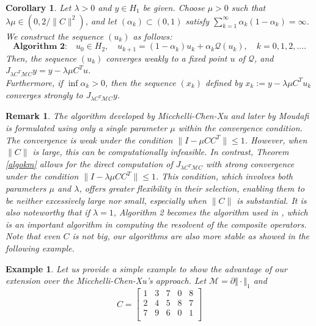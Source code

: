 \documentclass[11pt]{article}
\theoremstyle{plain}
\newtheorem{remark}{Remark}
\newtheorem{example}{Example}
\newtheorem{corollary}[theorem]{Corollary}
\begin{document}
{\begin{corollary}\label{alkm}
Let $\lambda > 0$ and $y \in H_1$ be given. Choose $\mu>0$ such that ${\lambda}{\mu} \in (0, 2/\|C\|^2)$, and let $(\alpha_k) \subset (0,1)$ satisfy $\sum_{k=1}^\infty \alpha_k (1 - \alpha_k) = \infty$. We construct the sequence $(u_k)$ as follows:
\begin{equation*}
\textbf{Algorithm 2:} \quad u_0 \in H_2, \quad u_{k+1} = (1 - \alpha_k)u_k + \alpha_k \mathcal{Q}(u_k), \quad k = 0, 1, 2, \ldots.
\end{equation*}
Then, the sequence $(u_k)$ converges weakly to a fixed point $u$ of $\mathcal{Q}$, and $J_{\lambda C^T \mathcal{M} C} y = y - \lambda \mu C^T u$.\\
Furthermore, if $\inf \alpha_k > 0$, then the sequence $(x_k)$ defined by $x_k := y - \lambda \mu C^T u_k$ converges strongly to $J_{\lambda C^T \mathcal{M} C} y$.
\end{corollary}
{
\begin{remark}\normalfont
The algorithm developed by Micchelli-Chen-Xu \cite{Micchelli} and later by Moudafi \cite{Moudafi} is formulated using only a single parameter $\mu$ within the convergence condition. The convergence is weak under the condition $\| I - \mu CC^T \| \leq 1$.  However, when $\|C\|$ is large, this can be computationally infeasible. In contrast, Theorem \ref{algokm} allows for the direct computation of $J_{\lambda C^T\mathcal{M}C}$ with strong convergence under the condition  $\| I - \lambda \mu CC^T \| \leq 1$. This condition, which involves both parameters $\mu$ and $\lambda$, offers greater flexibility in their selection, enabling them to be neither excessively large nor small, especially when $\|C\|$ is substantial. It is also noteworthy that if $\lambda=1$, Algorithm  2 becomes the algorithm used in \cite{Micchelli,Moudafi}, which is an important algorithm in computing the resolvent of the composite operators. Note that even $C$ is not big, our algorithms are also more stable as showed in the following example. 
\end{remark}
}
\begin{example} \label{ex1}
 Let us provide a simple example to show the advantage of our extension over the  Micchelli-Chen-Xu's approach. Let $\mathcal{M}=\partial \Vert \cdot \Vert_1$ and
$$
C=\begin{bmatrix}
1\;\;\; 3\;\;\; 7\;\; \;0\;\; \;8 \\
2 \;\;\;4 \;\;\;5 \;\;\;8\; \;\;7 \\
7\;\;\; 9\; \;\;6\; \;\;0 \;\;\;1 \\

\end{bmatrix}$$
\end{example}}
\end{document}
